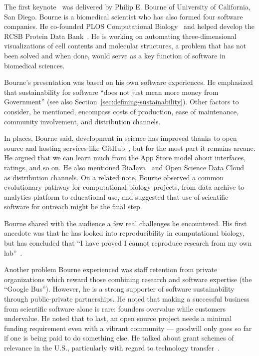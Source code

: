 \documentclass[11pt, oneside]{amsart}
\begin{document}
The first keynote~\cite{WSSSPE1-keynote1} was delivered by Philip
E. Bourne of University of California, San Diego.  Bourne is a
biomedical scientist who has also formed four software companies. He
co-founded PLOS Computational Biology~\cite{plos-web} and helped
develop the RCSB Protein Data Bank~\cite{pdb-web}.  He is working on
automating three-dimensional visualizations of cell contents and
molecular structures, a problem that has not been solved and when
done, would serve as a key function of software in biomedical
sciences.

Bourne's presentation was based on his own software experiences.  He
emphasized that sustainability for software ``does not just mean more
money from Government'' (see also
Section~\ref{sec:defining-sustainability}).  Other factors to
consider, he mentioned, encompass costs of production, ease of
maintenance, community involvement, and distribution channels.

In places, Bourne said, development in science has improved thanks to
open source and hosting services like GitHub~\cite{github-web}, but
for the most part it remains arcane. He argued that we can learn much
from the App Store model about interfaces, ratings, and so on. He also
mentioned BioJava~\cite{biojava-web} and Open Science Data
Cloud~\cite{osdc-web} as distribution channels.  On a related note,
Bourne observed a common evolutionary pathway for computational
biology projects, from data archive to analytics platform to
educational use, and suggested that use of scientific software for
outreach might be the final step.

Bourne shared with the audience a few real challenges he
encountered. His first anecdote was that he has looked into
reproducibility in computational biology, but has concluded that ``I
have proved I cannot reproduce research from my own
lab''~\cite{Veretnik}.

Another problem Bourne experienced was staff retention from private
organizations which reward those combining research and software
expertise (the ``Google Bus''). However, he is a strong supporter of
software sustainability through public-private partnerships. He noted
that making a successful business from scientific software alone is
rare: founders overvalue while customers undervalue. He noted that to
last, an open source project needs a minimal funding requirement even
with a vibrant community --- goodwill only goes so far if one is being
paid to do something else.  He talked about grant schemes of relevance
in the U.S., particularly with regard to technology
transfer~\cite{sbir-web, fased-web}.
\end{document}

